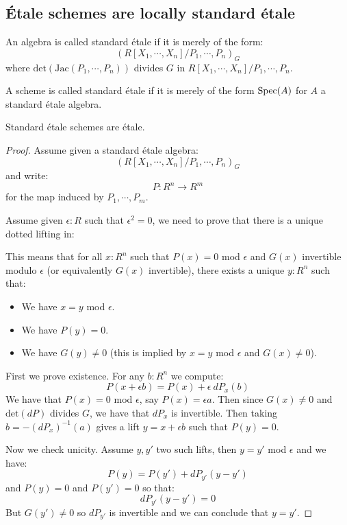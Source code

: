 \subsection{Étale schemes are locally standard étale}

\begin{definition}
An algebra is called standard étale if it is merely of the form:
\[(R[X_1,\cdots,X_n]/P_1,\cdots,P_n)_G\]
where $\mathrm{det}(\mathrm{Jac}(P_1,\cdots,P_n))$ divides $G$ in $R[X_1,\cdots,X_n]/P_1,\cdots,P_n$.
\end{definition}

\begin{definition}
A scheme is called standard étale if it is merely of the form $\operatorname{Spec}(A)$ for $A$ a standard étale algebra.
\end{definition}

\begin{lemma}\label{standard-etale-are-etale}
Standard étale schemes are étale.
\end{lemma}

\begin{proof}
Assume given a standard étale algebra:
\[(R[X_1,\cdots,X_n]/P_1,\cdots,P_n)_G\]
and write:
\[P:R^n\to R^m\]
for the map induced by $P_1,\cdots,P_m$.

Assume given $\epsilon:R$ such that $\epsilon^2=0$, we need to prove that there is a unique dotted lifting in:
  \begin{center}
    \end{center}
This means that for all $x:R^n$ such that $P(x)=0$ mod $\epsilon$ and $G(x)$ invertible modulo $\epsilon$ (or equivalently $G(x)$ invertible), there exists a unique $y:R^n$ such that:
\begin{itemize} 
\item We have $x=y$ mod $\epsilon$.
\item We have $P(y)=0$.
\item We have $G(y)\not=0$ (this is implied by $x=y$ mod $\epsilon$ and $G(x)\not=0$).
\end{itemize}

First we prove existence. For any $b:R^n$ we compute:
\[P(x+\epsilon b) = P(x) + \epsilon\ dP_x(b)\]
We have that $P(x)=0$ mod $\epsilon$, say $P(x) = \epsilon a$. Then since $G(x)\not=0$ and $\mathrm{det}(dP)$ divides $G$, we have that $dP_x$ is invertible. Then taking $b = -(dP_x)^{-1}(a)$ gives a lift $y=x+\epsilon b$ such that $P(y) = 0$.

Now we check unicity. Assume $y,y'$ two such lifts, then $y=y'$ mod $\epsilon$ and we have:
\[P(y) = P(y') + dP_{y'}(y-y')\]
and $P(y)=0$ and $P(y')=0$ so that:
\[dP_{y'}(y-y') = 0\]
But $G(y')\not=0$ so $dP_{y'}$ is invertible and we can conclude that $y=y'$.
\end{proof}

